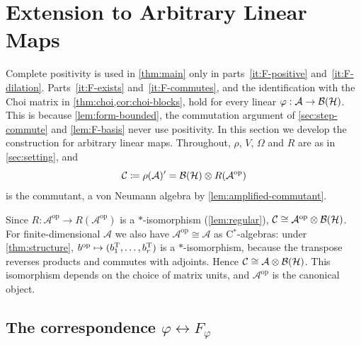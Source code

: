 \documentclass[12pt]{article}
\newcommand{\alg}{\mathcal{A}}             %
\newcommand{\hilb}{\mathcal{H}}            %
\newcommand{\bdd}[1]{\mathcal{B}\br{#1}}   %
\newcommand{\op}{^{\mathrm{op}}}           %
\newcommand{\Fphi}{F_{\varphi}}            %
\begin{document}
\section{Extension to Arbitrary Linear Maps}
\label{sec:linear}

Complete positivity is used in \cref{thm:main} only in parts~\ref{it:F-positive}
and~\ref{it:F-dilation}. Parts~\ref{it:F-exists} and~\ref{it:F-commutes}, and the
identification with the Choi matrix in \cref{thm:choi,cor:choi-blocks}, hold for
every linear \(\varphi : \alg \to \bdd{\hilb}\). This is because
\cref{lem:form-bounded}, the commutation argument of \cref{sec:step-commute}
and \cref{lem:F-basis} never use positivity. In this section we develop the
construction for arbitrary linear maps. Throughout, \(\rho\), \(V\), \(\Omega\)
and \(R\) are as in \cref{sec:setting}, and
\[
  \mathcal{C} \eqdef \rho(\alg)' = \bdd{\hilb} \tensor R(\alg\op)
\]
is the commutant, a von Neumann algebra by \cref{lem:amplified-commutant}.

\begin{remark}[\(\mathcal{C}\) as \(\alg \tensor \bdd{\hilb}\)]
\label{rem:op-iso}
Since \(R : \alg\op \to R(\alg\op)\) is a \(*\)-isomorphism (\cref{lem:regular}),
\(\mathcal{C} \cong \alg\op \tensor \bdd{\hilb}\). For finite-dimensional \(\alg\)
we also have \(\alg\op \cong \alg\) as C\(^*\)-algebras: under
\cref{thm:structure}, \(b\op \mapsto (b_1^\transpose, \dots, b_r^\transpose)\) is
a \(*\)-isomorphism, because the transpose reverses products and commutes with
adjoints. Hence \(\mathcal{C} \cong \alg \tensor \bdd{\hilb}\). This isomorphism
depends on the choice of matrix units, and \(\alg\op\) is the canonical object.
\end{remark}

\subsection{The correspondence \texorpdfstring{\(\varphi \leftrightarrow \Fphi\)}{phi <-> F}}
\label{sec:linear-bijection}
\end{document}
